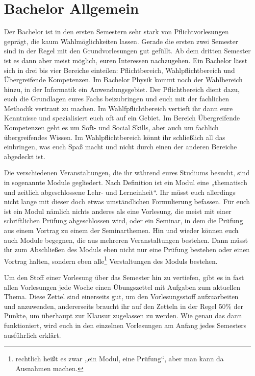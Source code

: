 \section{Bachelor Allgemein}
Der Bachelor ist in den ersten Semestern sehr stark von Pflichtvorlesungen geprägt, die kaum Wahlmöglichkeiten lassen. Gerade die ersten zwei Semester sind in der Regel mit den Grundvorlesungen gut gefüllt. Ab dem dritten Semester ist es dann aber meist möglich, euren Interessen nachzugehen. Ein Bachelor lässt sich in drei bis vier Bereiche einteilen: Pflichtbereich, Wahlpflichtbereich und Übergreifende Kompetenzen. Im Bachelor Physik kommt noch der Wahlbereich hinzu, in der Informatik ein Anwendungsgebiet. Der Pflichtbereich dient dazu, euch die Grundlagen eures Fachs beizubringen und euch mit der fachlichen Methodik vertraut zu machen. Im Wahlfpflichtbereich vertieft ihr dann eure Kenntnisse und spezialisiert euch oft auf ein Gebiet. Im Bereich Übergreifende Kompetenzen geht es um Soft- und Social Skills, aber auch um fachlich übergreifendes Wissen. Im Wahlpflichtbereich könnt ihr schließlich all das einbringen, was euch Spaß macht und nicht durch einen der anderen Bereiche abgedeckt ist.

Die verschiedenen Veranstaltungen, die ihr während eures Studiums besucht, sind in sogenannte Module gegliedert. Nach Definition ist ein Modul eine „thematisch und zeitlich abgeschlossene Lehr- und Lerneinheit“. Ihr müsst euch allerdings nicht lange mit dieser doch etwas umständlichen Formulierung befassen. Für euch ist ein Modul nämlich nichts anderes als eine Vorlesung, die meist mit einer schriftlichen Prüfung abgeschlossen wird, oder ein Seminar, in dem die Prüfung aus einem Vortrag zu einem der Seminarthemen. Hin und wieder können euch auch Module begegnen, die aus mehreren Veranstaltungen bestehen. Dann müsst ihr zum Abschließen des Moduls eben nicht nur eine Prüfung bestehen oder einen Vortrag halten, sondern eben alle\footnote{rechtlich heißt es zwar „ein Modul, eine Prüfung“, aber man kann da Ausnahmen machen.} Verstaltungen des Moduls bestehen.

Um den Stoff einer Vorlesung über das Semester hin zu vertiefen, gibt es in fast allen Vorlesungen jede Woche einen Übungszettel mit Aufgaben zum aktuellen Thema. Diese Zettel sind einerseits gut, um den Vorlesungsstoff aufzuarbeiten und anzuwenden, andererseits braucht ihr auf den Zetteln in der Regel 50\% der Punkte, um überhaupt zur Klausur zugelassen zu werden. Wie genau das dann funktioniert, wird euch in den einzelnen Vorlesungen am Anfang jedes Semesters ausführlich erklärt.

